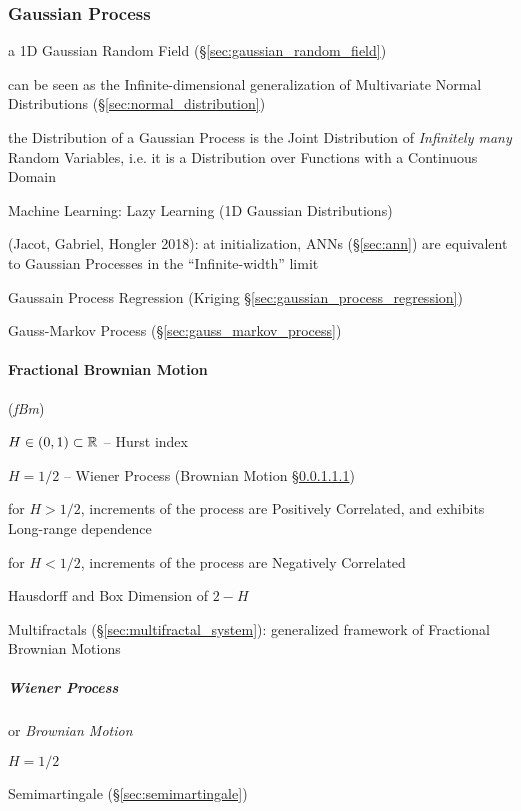 \subsubsection{Gaussian Process}\label{sec:gaussian_process}

a 1D Gaussian Random Field (\S\ref{sec:gaussian_random_field})

can be seen as the Infinite-dimensional generalization of Multivariate Normal
Distributions (\S\ref{sec:normal_distribution})

the Distribution of a Gaussian Process is the Joint Distribution of
\emph{Infinitely many} Random Variables, i.e. it is a Distribution over
Functions with a Continuous Domain

Machine Learning: Lazy Learning (1D Gaussian Distributions)

(Jacot, Gabriel, Hongler 2018): at initialization, ANNs (\S\ref{sec:ann}) are
equivalent to Gaussian Processes in the ``Infinite-width'' limit

Gaussain Process Regression (Kriging \S\ref{sec:gaussian_process_regression})

\fist Gauss-Markov Process (\S\ref{sec:gauss_markov_process})



\paragraph{Fractional Brownian Motion}\label{sec:fractional_brownian}\hfill

(\emph{fBm})

$H \in (0,1) \subset \mathbb{R}$ -- Hurst index

$H = 1/2$ -- Wiener Process (Brownian Motion \S\ref{sec:wiener_process})

for $H > 1/2$, increments of the process are Positively Correlated, and exhibits
Long-range dependence

for $H < 1/2$, increments of the process are Negatively Correlated

Hausdorff and Box Dimension of $2 - H$

\fist Multifractals (\S\ref{sec:multifractal_system}): generalized framework of
Fractional Brownian Motions



\subparagraph{Wiener Process}\label{sec:wiener_process}\hfill

or \emph{Brownian Motion}

$H = 1/2$

Semimartingale (\S\ref{sec:semimartingale})



